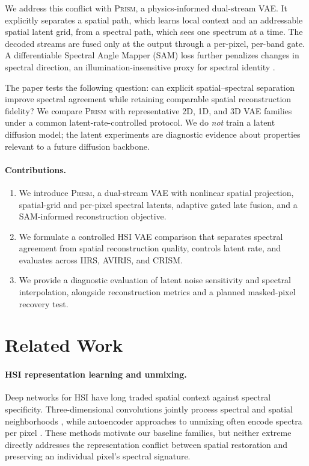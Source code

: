 \documentclass{article}
\newcommand{\prism}{\textsc{Prism}}
\begin{document}
We address this conflict with \prism{}, a physics-informed dual-stream VAE. It explicitly separates a spatial path, which learns local context and an addressable spatial latent grid, from a spectral path, which sees one spectrum at a time. The decoded streams are fused only at the output through a per-pixel, per-band gate. A differentiable Spectral Angle Mapper (SAM) loss further penalizes changes in spectral direction, an illumination-insensitive proxy for spectral identity \citep{kruse1993sips}.

The paper tests the following question: can explicit spatial--spectral separation improve spectral agreement while retaining comparable spatial reconstruction fidelity? We compare \prism{} with representative 2D, 1D, and 3D VAE families under a common latent-rate-controlled protocol. We do \emph{not} train a latent diffusion model; the latent experiments are diagnostic evidence about properties relevant to a future diffusion backbone.

\paragraph{Contributions.}
\begin{enumerate}
    \item We introduce \prism{}, a dual-stream VAE with nonlinear spatial projection, spatial-grid and per-pixel spectral latents, adaptive gated late fusion, and a SAM-informed reconstruction objective.
    \item We formulate a controlled HSI VAE comparison that separates spectral agreement from spatial reconstruction quality, controls latent rate, and evaluates across IIRS, AVIRIS, and CRISM.
    \item We provide a diagnostic evaluation of latent noise sensitivity and spectral interpolation, alongside reconstruction metrics and a planned masked-pixel recovery test.
\end{enumerate}

\section{Related Work}

\paragraph{HSI representation learning and unmixing.}
Deep networks for HSI have long traded spatial context against spectral specificity. Three-dimensional convolutions jointly process spectral and spatial neighborhoods \citep{chen2016deep,roy2020hybridsn}, while autoencoder approaches to unmixing often encode spectra per pixel \citep{palsson2018unmixing,su2019daen}. These methods motivate our baseline families, but neither extreme directly addresses the representation conflict between spatial restoration and preserving an individual pixel's spectral signature.
\end{document}
